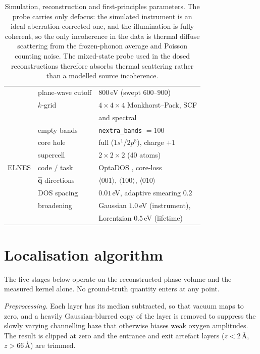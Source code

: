 \documentclass[aps,prb,twocolumn,superscriptaddress,floatfix,nofootinbib]{revtex4-2}
\begin{document}
\begin{table}[t]
\begin{tabular}{@{}lll@{}}
           & plane-wave cutoff & $800$\,eV (swept $600$--$900$) \\
           & $k$-grid & $4\times4\times4$ Monkhorst--Pack, SCF \\
           &          & and spectral \\
           & empty bands & \texttt{nextra\_bands} $=100$ \\
           & core hole & full ($1s^1$/$2p^5$), charge $+1$ \\
           & supercell & $2\times2\times2$ (40 atoms) \\
    \addlinespace
    ELNES  & code / task & OptaDOS \citep{Morris2014}, core-loss \\
           & $\hat{\mathbf{q}}$ directions & $\langle001\rangle$, $\langle100\rangle$, $\langle010\rangle$ \\
           & DOS spacing & $0.01$\,eV, adaptive smearing $0.2$ \\
           & broadening & Gaussian $1.0$\,eV (instrument), \\
           &            & Lorentzian $0.5$\,eV (lifetime) \\
    \bottomrule
  \end{tabular}
  \caption{Simulation, reconstruction and first-principles parameters. The probe carries only
    defocus: the simulated instrument is an ideal aberration-corrected one, and the illumination
    is fully coherent, so the only incoherence in the data is thermal diffuse scattering from the
    frozen-phonon average and Poisson counting noise. The mixed-state probe used in the dosed
    reconstructions therefore absorbs thermal scattering rather than a modelled source
    incoherence.}
  \label{tab:params}
\end{table}

\section{Localisation algorithm}
\label{app:algo}
\setcounter{table}{0}
\setcounter{figure}{0}

The five stages below operate on the reconstructed phase volume and the measured kernel alone.
No ground-truth quantity enters at any point.

\emph{Preprocessing.} Each layer has its median subtracted, so that vacuum maps to zero, and a
heavily Gaussian-blurred copy of the layer is removed to suppress the slowly varying channelling
haze that otherwise biases weak oxygen amplitudes. The result is clipped at zero and the
entrance and exit artefact layers ($z<2$\,\AA, $z>66$\,\AA) are trimmed.
\end{document}
